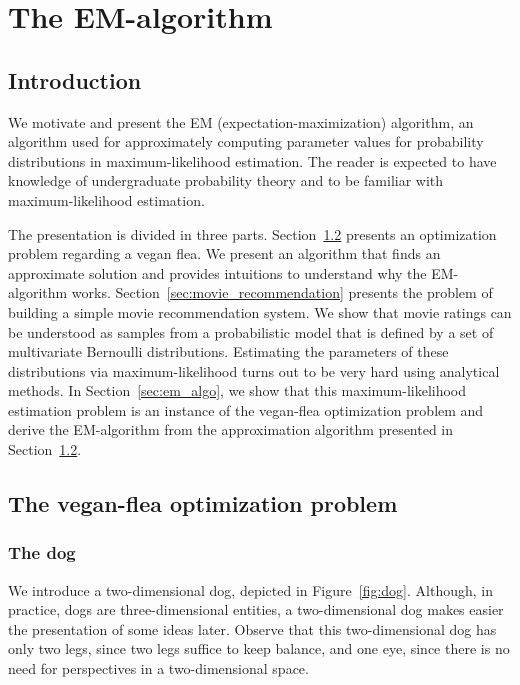 \chapter{The EM-algorithm}

\newcommand{\timedomain}{[0, \infty)}

\section{Introduction}

We motivate and present the EM (expectation-maximization) algorithm, an algorithm used for approximately computing parameter values for probability distributions in maximum-likelihood estimation. The reader is expected to have knowledge of undergraduate probability theory and to be familiar with maximum-likelihood estimation.

The presentation is divided in three parts. Section~\ref{sec:vegan_flea} presents an optimization problem regarding a vegan flea. We present an algorithm that finds an approximate solution and provides intuitions to understand why the EM-algorithm works. Section~\ref{sec:movie_recommendation} presents the problem of building a simple movie recommendation system. We show that movie ratings can be understood as samples from a probabilistic model that is defined by a set of multivariate Bernoulli distributions. Estimating the parameters of these distributions via maximum-likelihood turns out to be very hard using analytical methods. In Section~\ref{sec:em_algo}, we show that this maximum-likelihood estimation problem is an instance of the vegan-flea optimization problem and derive the EM-algorithm from the approximation algorithm presented in Section~\ref{sec:vegan_flea}.

\section{The vegan-flea optimization problem}
\label{sec:vegan_flea}

\subsection{The dog}

We introduce a two-dimensional dog, depicted in Figure~\ref{fig:dog}. Although, in practice, dogs are three-dimensional entities, a two-dimensional dog makes easier the presentation of some ideas later. Observe that this two-dimensional dog has only two legs, since two legs suffice to keep balance, and one eye, since there is no need for perspectives in a two-dimensional space. 

